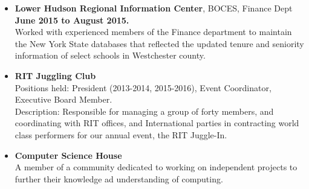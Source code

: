\documentclass[10pt]{article}
\begin{document}
\begin{itemize}[topsep=1ex, itemsep=1ex, partopsep=0ex, parsep=0ex]
	\item[]{{\bf Lower Hudson Regional Information Center}, BOCES, Finance Dept \hfill {\bf June 2015 to August 2015.}}\\
	Worked with experienced members of the Finance department to maintain the New York
	State databases that reflected the updated tenure and seniority information of select schools in Westchester county.
\end{itemize}
\vspace{1ex}
\begin{itemize} [topsep=1ex, itemsep=.25ex, partopsep=0ex, parsep=1ex]
	\item[] {\bf RIT Juggling Club}\\
	Positions held: President (2013-2014, 2015-2016), Event Coordinator, Executive Board Member.\\
	Description: Responsible for managing a group of forty members, and coordinating with RIT offices, and International parties in contracting world class performers for our annual event, the RIT Juggle-In.
	\item[] {\bf Computer Science House}\\
	A member of a community dedicated to working on independent projects to further their knowledge ad understanding of computing.
\end{itemize}
\end{document}
